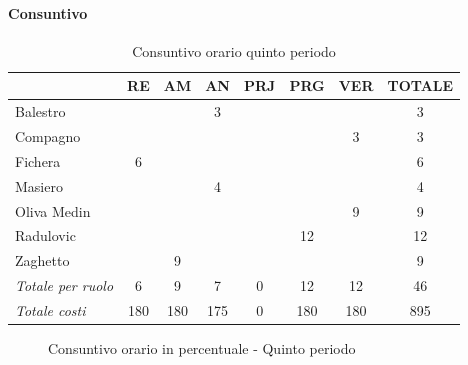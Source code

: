 \documentclass[a4paper,12pt]{article}
\begin{document}
            \paragraph{Consuntivo}
                \begin{table}[H]
                \centering
                \caption{Consuntivo orario quinto periodo}
                \begin{tabular}{|l|c|c|c|c|c|c|c|}
                \hline
                    \rowcolor{lightgray}{\textbf{Membro}} & {\textbf{RE}} & {\textbf{AM}} & {\textbf{AN}} & {\textbf{PRJ}} & {\textbf{PRG}} & {\textbf{VER}} & {\textbf{TOTALE}}\\
                \hline
                    Balestro & & & 3 & & & & 3\\
                \hline
                    Compagno & & & & & & 3 & 3\\
                \hline
                    Fichera & 6 & & & & & & 6\\
                \hline
                    Masiero & & & 4 & & & & 4\\
                \hline
                    Oliva Medin & & & & & & 9 & 9\\
                \hline
                    Radulovic & & & & & 12 & & 12\\
                \hline
                    Zaghetto & & 9 & & & & & 9\\
                \hline
                    \rowcolor{lightgray}\textit{Totale per ruolo} & 6 & 9 & 7 & 0 & 12 & 12 & 46\\
                \hline
                    \rowcolor{lightgray}\textit{Totale costi} & 180 & 180 & 175 & 0 & 180 & 180 & 895\\
                \hline
                \end{tabular}
                \end{table}

                \begin{figure}[H]
                \centering
                \caption{Consuntivo orario in percentuale - Quinto periodo}
                \end{figure}
                
\end{document}
